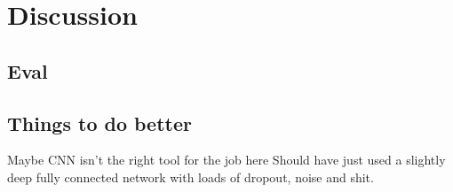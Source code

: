 \chapter{Discussion}
\section{Eval}
\section{Things to do better}


Maybe CNN isn't the right tool for the job here
Should have just used a slightly deep fully connected network
with loads of dropout, noise and shit.
